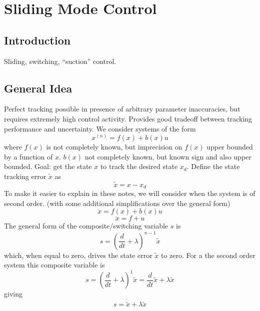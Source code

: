 \section{Sliding Mode Control}

\subsection{Introduction}

Sliding, switching, ``suction'' control.

\subsection{General Idea}

Perfect tracking possible in presence of arbitrary parameter inaccuracies, but requires extremely high control activity.
Provides good tradeoff between tracking performance and uncertainty.
We consider systems of the form
\begin{equation*}
  x^{(n)}=f(x)+b(x)u
\end{equation*}
where $f(x)$ is not completely known, but imprecision on $f(x)$ upper bounded by a function of $x$.
$b(x)$ not completely known, but known sign and also upper bounded.
Goal: get the state $x$ to track the desired state $x_{d}$.
Define the state tracking error $\tilde{x}$ as
\begin{equation*}
  \tilde{x}=x-x_{d}
\end{equation*}
To make it easier to explain in these notes, we will consider when the system is of second order.
(with some additional simplifications over the general form)
\begin{equation*}
  \ddot{x}=f(x)+b(x)u
\end{equation*}
\begin{equation*}
  \ddot{x}=f+u
\end{equation*}
The general form of the composite/switching variable $s$ is
\begin{equation*}
  s=\left(\frac{d}{dt}+\lambda\right)^{n-1}\tilde{x}
\end{equation*}
which, when equal to zero, drives the state error $\tilde{x}$ to zero.
For a the second order system this composite variable is
\begin{equation*}
  s=\left(\frac{d}{dt}+\lambda\right)^{1}\tilde{x}=\frac{d}{dt}\tilde{x}+\lambda\tilde{x}
\end{equation*}
giving
\begin{equation*}
  s=\dot{\tilde{x}}+\lambda\tilde{x}
\end{equation*}
